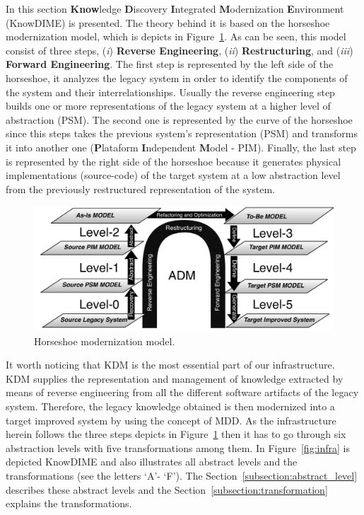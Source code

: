 In this section \textbf{Know}ledge \textbf{D}iscovery \textbf{I}ntegrated \textbf{M}odernization \textbf{E}nvironment (KnowDIME) is presented. The theory behind it is based on the horseshoe modernization model, which is depicts in Figure~\ref{fig:horseshoe}. As can be seen, this model consist of three steps, (\textit{i}) \textbf{Reverse Engineering}, (\textit{ii}) \textbf{Restructuring}, and (\textit{iii}) \textbf{Forward Engineering}. The first step is represented by the left side of the horseshoe, it analyzes the legacy system in order to identify the components of the system and their interrelationships. Usually the reverse engineering step builds one or more representations of the legacy system at a higher level of abstraction (PSM). The second one is represented by the curve of the horseshoe since this steps takes the previous system's representation (PSM) and transforms it into another one (\textbf{P}lataform \textbf{I}ndependent \textbf{M}odel - PIM). Finally, the last step is represented by the right side of the horseshoe because it generates physical implementations (source-code) of the target system at a low abstraction level from the previously restructured representation of the system.

\begin{figure}[!h]
\centering
  \includegraphics[scale=0.6]{Figuras/horseShoeBOM}
\caption{Horseshoe modernization model.}
\label{fig:horseshoe}
\end{figure}

It worth noticing that KDM is the most essential part of our infrastructure. KDM supplies the representation and management of knowledge extracted by means of reverse engineering from all the different software artifacts of the legacy system. Therefore, the legacy knowledge obtained is then modernized into a target improved system by using the concept of MDD. As the infrastructure herein follows the three steps depicts in Figure~\ref{fig:horseshoe} then it has to go through six abstraction levels with five transformations among them. In Figure~\ref{fig:infra} is depicted KnowDIME and also illustrates all abstract levels and the transformations (see the letters `A'- `F'). The Section~\ref{subsection:abstract_level} describes these abstract levels and the Section~\ref{subsection:transformation} explains the transformations.

